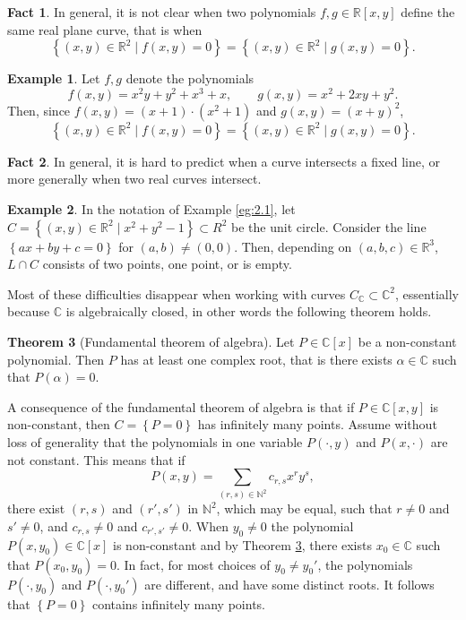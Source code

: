 \documentclass{article}
\newcommand{\N}{\mathbb{N}}
\newcommand{\R}{\mathbb{R}}
\newcommand{\C}{\mathbb{C}}
\newcommand{\rb}[1]{\left( #1 \right)}
\renewcommand{\sb}[1]{\left[ #1 \right]}
\newcommand{\cb}[1]{\left\{ #1 \right\}}
\theoremstyle{definition}\newtheorem{definition}{Definition}[section]
\theoremstyle{definition}\newtheorem{notation}[definition]{Notation}
\theoremstyle{definition}\newtheorem{remark}[definition]{Remark}
\theoremstyle{definition}\newtheorem{example}[definition]{Example}
\theoremstyle{definition}\newtheorem{fact}{Fact}
\theoremstyle{definition}\newtheorem{exercise}{Exercise}
\newtheorem{theorem}[definition]{Theorem}
\begin{document}
\begin{fact}
In general, it is not clear when two polynomials $ f, g \in \R\sb{x, y} $ define the same real plane curve, that is when
$$ \cb{\rb{x, y} \in \R^2 \mid f\rb{x, y} = 0} = \cb{\rb{x, y} \in \R^2 \mid g\rb{x, y} = 0}. $$
\end{fact}

\begin{example}
Let $ f, g $ denote the polynomials
$$ f\rb{x, y} = x^2y + y^2 + x^3 + x, \qquad g\rb{x, y} = x^2 + 2xy + y^2. $$
Then, since $ f\rb{x, y} = \rb{x + 1} \cdot \rb{x^2 + 1} $ and $ g\rb{x, y} = \rb{x + y}^2 $,
$$ \cb{\rb{x, y} \in \R^2 \mid f\rb{x, y} = 0} = \cb{\rb{x, y} \in \R^2 \mid g\rb{x, y} = 0}. $$
\end{example}

\begin{fact}
In general, it is hard to predict when a curve intersects a fixed line, or more generally when two real curves intersect.
\end{fact}

\begin{example}
In the notation of Example \ref{eg:2.1}, let $ C = \cb{\rb{x, y} \in \R^2 \mid x^2 + y^2 - 1} \subset R^2 $ be the unit circle. Consider the line $ \cb{ax + by + c = 0} $ for $ \rb{a, b} \ne \rb{0, 0} $. Then, depending on $ \rb{a, b, c} \in \R^3 $, $ L \cap C $ consists of two points, one point, or is empty.
\end{example}

Most of these difficulties disappear when working with curves $ C_\C \subset \C^2 $, essentially because $ \C $ is algebraically closed, in other words the following theorem holds.

\begin{theorem}[Fundamental theorem of algebra]
\label{thm:2.4}
Let $ P \in \C\sb{x} $ be a non-constant polynomial. Then $ P $ has at least one complex root, that is there exists $ \alpha \in \C $ such that $ P\rb{\alpha} = 0 $.
\end{theorem}

A consequence of the fundamental theorem of algebra is that if $ P \in \C\sb{x, y} $ is non-constant, then $ C = \cb{P = 0} $ has infinitely many points. Assume without loss of generality that the polynomials in one variable $ P\rb{\cdot, y} $ and $ P\rb{x, \cdot} $ are not constant. This means that if
$$ P\rb{x, y} = \sum_{\rb{r, s} \in \N^2} c_{r, s}x^ry^s, $$
there exist $ \rb{r, s} $ and $ \rb{r', s'} $ in $ \N^2 $, which may be equal, such that $ r \ne 0 $ and $ s' \ne 0 $, and $ c_{r, s} \ne 0 $ and $ c_{r', s'} \ne 0 $. When $ y_0 \ne 0 $ the polynomial $ P\rb{x, y_0} \in \C\sb{x} $ is non-constant and by Theorem \ref{thm:2.4}, there exists $ x_0 \in \C $ such that $ P\rb{x_0, y_0} = 0 $. In fact, for most choices of $ y_0 \ne y_0' $, the polynomials $ P\rb{\cdot, y_0} $ and $ P\rb{\cdot, y_0'} $ are different, and have some distinct roots. It follows that $ \cb{P = 0} $ contains infinitely many points.
\end{document}
